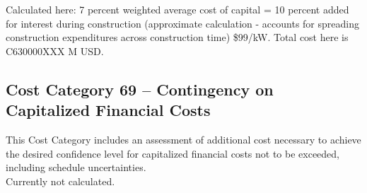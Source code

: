 Calculated here: 7 percent weighted average cost of capital = 10 percent added for interest during
construction (approximate calculation - accounts for spreading construction expenditures across construction time) \$99/kW. Total cost here is C630000XXX M USD.

\subsection*{Cost Category 69 – Contingency on Capitalized Financial Costs}
This Cost Category includes an assessment of additional cost necessary to achieve the desired confidence level for capitalized financial costs not to be exceeded, including schedule uncertainties.\\

Currently not calculated.



